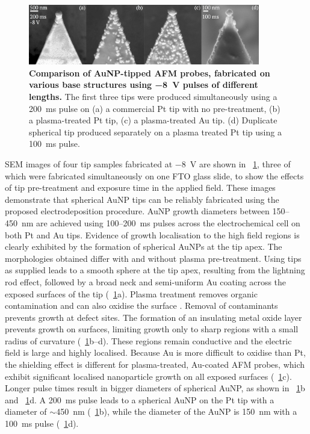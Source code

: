 \documentclass{article}
\begin{document}
\begin{figure}[bt]
\centering
\includegraphics[width=0.9\textwidth]{figures/figure_2}
\caption[Comparison of AuNP-tipped AFM probes, fabricated on various base structures using \SI{-8}{V} pulses of different lengths]{\textbf{Comparison of AuNP-tipped AFM probes, fabricated on various base structures using \SI{-8}{V} pulses of different lengths.} The first three tips were produced simultaneously using a \SI{200}{ms} pulse on (a) a commercial Pt tip with no pre-treatment, (b) a plasma-treated Pt tip, (c) a plasma-treated Au tip. (d) Duplicate spherical tip produced separately on a plasma treated Pt tip using a \SI{100}{ms} pulse.}
\label{fig:electrochemical_tips}
\end{figure}

SEM images of four tip samples fabricated at \SI{-8}{V} are shown in \figurename~\ref{fig:electrochemical_tips}, three of which were fabricated simultaneously on one FTO glass slide, to show the effects of tip pre-treatment and exposure time in the applied field. These images demonstrate that spherical AuNP tips can be reliably fabricated using the proposed electrodeposition procedure. AuNP growth diameters between 150--\SI{450}{nm} are achieved using 100--\SI{200}{ms} pulses across the electrochemical cell on both Pt and Au tips. Evidence of growth localisation to the high field regions is clearly exhibited by the formation of spherical AuNPs at the tip apex. The morphologies obtained differ with and without plasma pre-treatment. Using tips as supplied leads to a smooth sphere at the tip apex, resulting from the lightning rod effect, followed by a broad neck and semi-uniform Au coating across the exposed surfaces of the tip (\figurename~\ref{fig:electrochemical_tips}a). Plasma treatment removes organic contamination and can also oxidise the surface \cite{li2003, fuchs2009}. Removal of contaminants prevents growth at defect sites. The formation of an insulating metal oxide layer prevents growth on surfaces, limiting growth only to sharp regions with a small radius of curvature (\figurename~\ref{fig:electrochemical_tips}b--d). These regions remain conductive and the electric field is large and highly localised. Because Au is more difficult to oxidise than Pt, the shielding effect is different for plasma-treated, Au-coated AFM probes, which exhibit significant localised nanoparticle growth on all exposed surfaces (\figurename~\ref{fig:electrochemical_tips}c). Longer pulse times result in bigger diameters of spherical AuNP, as shown in \figurename~\ref{fig:electrochemical_tips}b and \figurename~\ref{fig:electrochemical_tips}d. A \SI{200}{ms} pulse leads to a spherical AuNP on the Pt tip with a diameter of $\sim$\SI{450}{nm} (\figurename~\ref{fig:electrochemical_tips}b), while the diameter of the AuNP is \SI{150}{nm} with a \SI{100}{ms} pulse (\figurename~\ref{fig:electrochemical_tips}d).
\end{document}
